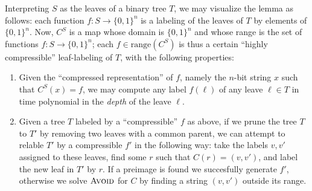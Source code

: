 \documentclass[11pt]{article}
\newcommand{\B}{\{0,1\}}
\newcommand{\avoid}{\textsc{Avoid}}
\begin{document}
Interpreting $S$ as the leaves of a binary tree $T$, we may visualize the lemma as follows: each function $f: S \to \B^n$ is a labeling of the leaves of $T$ by elements of $\B^n$. Now, $C^S$ is a map whose domain is $\B^n$ and whose range is the set of functions $f: S \to \B^n$; each $f \in \mathrm{range}(C^S)$ is thus a certain ``highly compressible'' leaf-labeling of $T$, with the following properties:
\begin{enumerate}
	\item Given the ``compressed representation'' of $f$, namely the $n$-bit string $x$ such that $C^S(x)=f$, we may compute any label $f(\ell)$ of any leave $\ell \in T$ in time polynomial in the \emph{depth} of the leave $\ell$.
	\item Given a tree $T$ labeled by a ``compressible'' $f$ as above, if we prune the tree $T$ to $T'$ by removing two leaves with a common parent, we can attempt to relable $T'$ by a compressible $f'$ in the following way: take the labels $v,v'$ assigned to these leaves, find some $r$ such that $C(r)=(v,v')$, and label the new leaf in $T'$ by $r$. If a preimage is found we succesfully generate $f'$, otherwise we solve $\avoid$
 for $C$ by finding a string $(v,v')$ outside its range.
 \end{enumerate}
\end{document}
